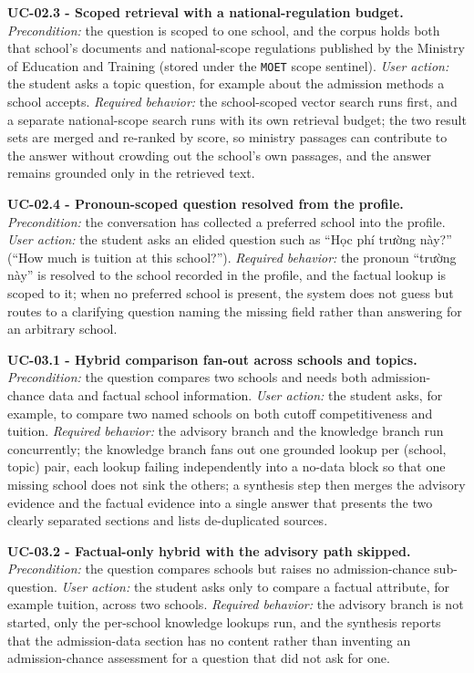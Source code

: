 \documentclass[../main.tex]{subfiles}
\begin{document}
\textbf{UC-02.3 - Scoped retrieval with a national-regulation budget.}
\textit{Precondition:} the question is scoped to one school, and the corpus holds both that school's documents and national-scope regulations published by the Ministry of Education and Training (stored under the \texttt{MOET} scope sentinel).
\textit{User action:} the student asks a topic question, for example about the admission methods a school accepts.
\textit{Required behavior:} the school-scoped vector search runs first, and a separate national-scope search runs with its own retrieval budget; the two result sets are merged and re-ranked by score, so ministry passages can contribute to the answer without crowding out the school's own passages, and the answer remains grounded only in the retrieved text.

\textbf{UC-02.4 - Pronoun-scoped question resolved from the profile.}
\textit{Precondition:} the conversation has collected a preferred school into the profile.
\textit{User action:} the student asks an elided question such as ``Học phí trường này?'' (``How much is tuition at this school?'').
\textit{Required behavior:} the pronoun ``trường này'' is resolved to the school recorded in the profile, and the factual lookup is scoped to it; when no preferred school is present, the system does not guess but routes to a clarifying question naming the missing field rather than answering for an arbitrary school.

\textbf{UC-03.1 - Hybrid comparison fan-out across schools and topics.}
\textit{Precondition:} the question compares two schools and needs both admission-chance data and factual school information.
\textit{User action:} the student asks, for example, to compare two named schools on both cutoff competitiveness and tuition.
\textit{Required behavior:} the advisory branch and the knowledge branch run concurrently; the knowledge branch fans out one grounded lookup per (school, topic) pair, each lookup failing independently into a no-data block so that one missing school does not sink the others; a synthesis step then merges the advisory evidence and the factual evidence into a single answer that presents the two clearly separated sections and lists de-duplicated sources.

\textbf{UC-03.2 - Factual-only hybrid with the advisory path skipped.}
\textit{Precondition:} the question compares schools but raises no admission-chance sub-question.
\textit{User action:} the student asks only to compare a factual attribute, for example tuition, across two schools.
\textit{Required behavior:} the advisory branch is not started, only the per-school knowledge lookups run, and the synthesis reports that the admission-data section has no content rather than inventing an admission-chance assessment for a question that did not ask for one.
\end{document}
